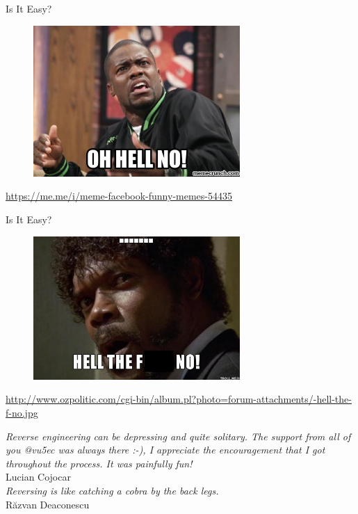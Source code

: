 \documentclass{simple}
\begin{document}
\begin{frame}{Is It Easy?}
  \begin{figure}
    \centering
    \includegraphics[width=0.7\textwidth]{img/hell-no}
  \end{figure}
  \begin{center}
    \tiny
    \url{https://me.me/i/meme-facebook-funny-memes-54435}
  \end{center}
\end{frame}

\begin{frame}{Is It Easy?}
  \begin{figure}
    \centering
    \includegraphics[width=0.7\textwidth]{img/hell-the-f-no}
  \end{figure}
  \begin{center}
    \tiny
    \url{http://www.ozpolitic.com/cgi-bin/album.pl?photo=forum-attachments/-hell-the-f-no.jpg}
  \end{center}
\end{frame}

\begin{frame}{}
  \pause \textit{Reverse engineering can be depressing and quite solitary. The support from all of you @vu5ec was always there :-), I appreciate the encouragement that I got throughout the process. It was painfully fun!} \\
  \hfill Lucian Cojocar \\
  \vspace{0.5cm}
  \pause \textit{Reversing is like catching a cobra by the back legs.} \\
  \hfill Răzvan Deaconescu
\end{frame}
\end{document}
